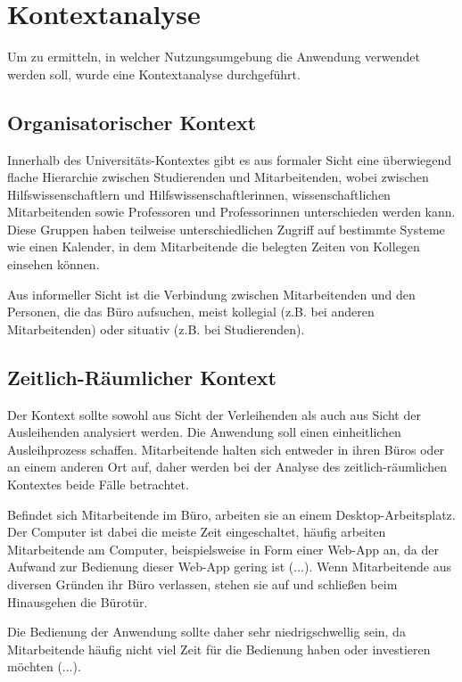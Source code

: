 \section{Kontextanalyse}
\label{section:kontext}

Um zu ermitteln, in welcher Nutzungsumgebung die Anwendung verwendet werden soll, wurde eine
Kontextanalyse durchgeführt.

\subsection*{Organisatorischer Kontext}
Innerhalb des Universitäts-Kontextes gibt es aus formaler Sicht eine überwiegend flache Hierarchie
zwischen Studierenden und Mitarbeitenden, wobei zwischen Hilfswissenschaftlern und
Hilfswissenschaftlerinnen, wissenschaftlichen Mitarbeitenden sowie Professoren und Professorinnen
unterschieden werden kann. Diese Gruppen haben teilweise unterschiedlichen Zugriff auf bestimmte
Systeme wie einen Kalender, in dem Mitarbeitende die belegten Zeiten von Kollegen einsehen können.

Aus informeller Sicht ist die Verbindung zwischen Mitarbeitenden und den Personen, die das Büro
aufsuchen, meist kollegial (z.B. bei anderen Mitarbeitenden) oder situativ (z.B. bei Studierenden).

\subsection*{Zeitlich-Räumlicher Kontext}
\label{section:zeit}
Der Kontext sollte sowohl aus Sicht der Verleihenden als auch aus Sicht der Ausleihenden analysiert
werden. Die Anwendung soll einen einheitlichen Ausleihprozess schaffen. Mitarbeitende halten sich
entweder in ihren Büros oder an einem anderen Ort auf, daher werden bei der Analyse des
zeitlich-räumlichen Kontextes beide Fälle betrachtet.

Befindet sich Mitarbeitende im Büro, arbeiten sie an einem Desktop-Arbeitsplatz. Der Computer ist
dabei die meiste Zeit eingeschaltet, häufig arbeiten Mitarbeitende am Computer, beispielsweise in
Form einer Web-App an, da der Aufwand zur Bedienung dieser Web-App gering ist (...). Wenn
Mitarbeitende aus diversen Gründen ihr Büro verlassen, stehen sie auf und schließen beim Hinausgehen
die Bürotür.

Die Bedienung der Anwendung sollte daher sehr niedrigschwellig sein, da Mitarbeitende häufig nicht
viel Zeit für die Bedienung haben oder investieren möchten (...).

